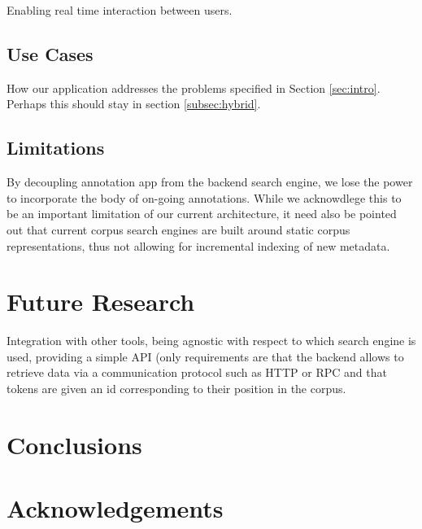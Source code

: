 \documentclass{sig-alternate}
\begin{document}
Enabling real time interaction between users.

\subsection{Use Cases}
How our application addresses the problems specified in Section \ref{sec:intro}. Perhaps this
should stay in section \ref{subsec:hybrid}.

\subsection{Limitations}
By decoupling annotation app from the backend search engine, we lose the power to incorporate
the body of on-going annotations.
While we acknowdlege this to be an important limitation of our current architecture, it need
also be pointed out that current corpus search engines are built around static corpus
representations, thus not allowing for incremental indexing of new metadata.

\section{Future Research}\label{sec:future}
Integration with other tools, being agnostic with respect to which search engine is used,
providing a simple API (only requirements are that the backend allows to retrieve data via
a communication protocol such as HTTP or RPC and that tokens are given an id corresponding
to their position in the corpus.

\section{Conclusions}\label{sec:conclusion}

\section{Acknowledgements}



%
%

\end{document}
